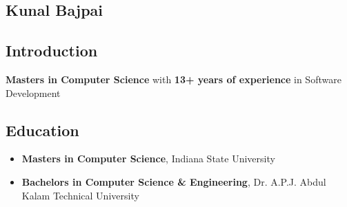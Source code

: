 \documentclass[letterpaper,11pt]{article}
\begin{document}
\begin{center}
\section{Kunal Bajpai}
\end{center}

\subsection{Introduction}
\textbf{Masters in Computer Science} with \textbf{13+ years of experience} in Software Development

\subsection{Education}
\begin{itemize}
	\item \textbf{Masters in Computer Science}, Indiana State University
	\item \textbf{Bachelors in Computer Science \& Engineering}, Dr. A.P.J. Abdul Kalam Technical University
\end{itemize}
\end{document}
